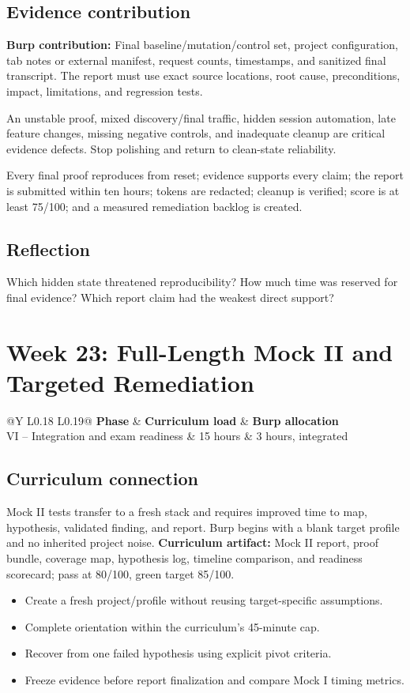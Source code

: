 \documentclass[11pt]{article}
\makeatletter
\newcommand{\weekheader}[5]{%
  \clearpage
  \section{Week #1: #2}
  \begin{tcolorbox}[colback=Navy,colframe=Navy,coltext=white]
    \begin{tabularx}{\linewidth}{@{}Y L{0.18\linewidth} L{0.19\linewidth}@{}}
      \textbf{Phase} & \textbf{Curriculum load} & \textbf{Burp allocation}\\
      #3 & #4 hours & #5 hours, integrated
    \end{tabularx}
  \end{tcolorbox}
}
\newcommand{\weekfield}[2]{%
  \Needspace{5\baselineskip}
  \subsection*{#1}
  #2
}
\newcommand{\curriculumartifact}[1]{\textbf{Curriculum artifact:} #1}
\newcommand{\burpevidence}[1]{\textbf{Burp contribution:} #1}
\makeatother
\begin{document}
\weekfield{Evidence contribution}{\burpevidence{Final baseline/mutation/control
set, project configuration, tab notes or external manifest, request counts,
timestamps, and sanitized final transcript.} The report must use exact source
locations, root cause, preconditions, impact, limitations, and regression tests.}

\begin{troubleshootingbox}
An unstable proof, mixed discovery/final traffic, hidden session automation,
late feature changes, missing negative controls, and inadequate cleanup are
critical evidence defects. Stop polishing and return to clean-state reliability.
\end{troubleshootingbox}

\begin{checkpoints}
Every final proof reproduces from reset; evidence supports every claim; the report
is submitted within ten hours; tokens are redacted; cleanup is verified; score is
at least 75/100; and a measured remediation backlog is created.
\end{checkpoints}

\weekfield{Reflection}{Which hidden state threatened reproducibility? How much
time was reserved for final evidence? Which report claim had the weakest direct
support?}

\weekheader{23}{Full-Length Mock II and Targeted Remediation}{VI -- Integration and exam readiness}{15}{3}

\weekfield{Curriculum connection}{Mock II tests transfer to a fresh stack and
requires improved time to map, hypothesis, validated finding, and report. Burp
begins with a blank target profile and no inherited project noise.
\curriculumartifact{Mock II report, proof bundle, coverage map, hypothesis log,
timeline comparison, and readiness scorecard; pass at 80/100, green target 85/100.}}

\begin{objectivebox}
\begin{itemize}
  \item Create a fresh project/profile without reusing target-specific assumptions.
  \item Complete orientation within the curriculum's 45-minute cap.
  \item Recover from one failed hypothesis using explicit pivot criteria.
  \item Freeze evidence before report finalization and compare Mock I timing metrics.
\end{itemize}
\end{objectivebox}
\end{document}
